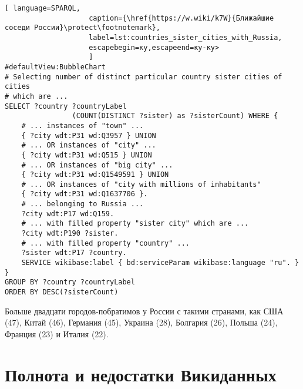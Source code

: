 \begin{lstlisting}[ language=SPARQL, 
                    caption={\href{https://w.wiki/k7W}{Ближайшие соседи России}\protect\footnotemark},
                    label=lst:countries_sister_cities_with_Russia, 
                    escapebegin=ку,escapeend=ку-ку>
                    ]
#defaultView:BubbleChart
# Selecting number of distinct particular country sister cities of cities 
# which are ...
SELECT ?country ?countryLabel 
				(COUNT(DISTINCT ?sister) as ?sisterCount) WHERE {  
	# ... instances of "town" ...                                                                
	{ ?city wdt:P31 wd:Q3957 } UNION
	# ... OR instances of "city" ...                                     
	{ ?city wdt:P31 wd:Q515 } UNION 
	# ... OR instances of "big city" ...                                     
	{ ?city wdt:P31 wd:Q1549591 } UNION 
	# ... OR instances of "city with millions of inhabitants"                                 
	{ ?city wdt:P31 wd:Q1637706 }.    
	# ... belonging to Russia ...                                   
	?city wdt:P17 wd:Q159.  
	# ... with filled property "sister city" which are ...                                            
	?city wdt:P190 ?sister.   
	# ... with filled property "country" ...                                           
	?sister wdt:P17 ?country.                                            
	SERVICE wikibase:label { bd:serviceParam wikibase:language "ru". }
}
GROUP BY ?country ?countryLabel
ORDER BY DESC(?sisterCount)
\end{lstlisting}

Больше двадцати городов-побратимов у России с такими странами, как США (47), Китай (46), Германия (45), Украина (28), Болгария (26), Польша (24), Франция (23) и Италия (22).

\section{Полнота и недостатки Викиданных}


